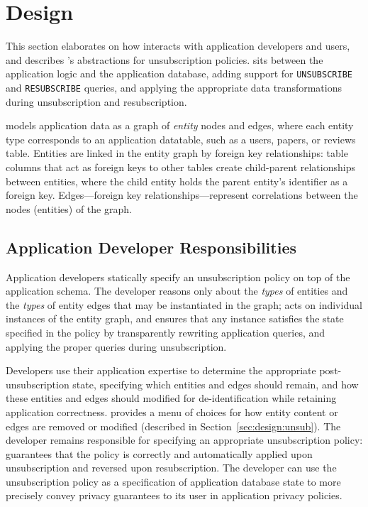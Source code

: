 \section{Design}
This section elaborates on how \proto interacts with application developers and users, and describes
\proto's abstractions for unsubscription policies.
\proto sits between the application logic and the application database, adding support for
\texttt{UNSUBSCRIBE} and \texttt{RESUBSCRIBE} queries, and applying the appropriate data transformations
during unsubscription and resubscription.

\proto models application data as a graph of \emph{entity}
nodes and edges, where each entity type corresponds to an application datatable, such as a users,
papers, or reviews table.  Entities are linked in the entity graph by foreign key relationships:
table columns that act as foreign keys to other tables create child-parent relationships between
entities, where the child entity holds the parent entity's identifier as a foreign key. 
Edges---foreign key relationships---represent correlations between the nodes (entities) of the
graph.


\subsection{Application Developer Responsibilities}
Application developers statically specify an unsubscription policy on top of the application schema.
The developer reasons only about the \emph{types} of entities
and the \emph{types} of entity edges that may be instantiated in the graph; \proto acts on individual
instances of the entity graph, and ensures that any instance satisfies the state specified in the
policy by transparently rewriting application queries, and applying the proper queries during
unsubscription.

Developers use their application expertise to determine the appropriate post-unsubscription state,
specifying which entities and edges should remain, and how these entities and edges should modified
for de-identification while retaining application correctness. \proto provides a menu of choices for
how entity content or edges are removed or modified (described in Section~\ref{sec:design:unsub}).
The developer remains responsible for specifying an appropriate unsubscription policy: \proto
guarantees that the policy is correctly and automatically applied upon unsubscription and reversed
upon resubscription. The developer can use the unsubscription policy as a specification of
application database state to more precisely convey privacy guarantees to its user in \eg
application privacy policies.

